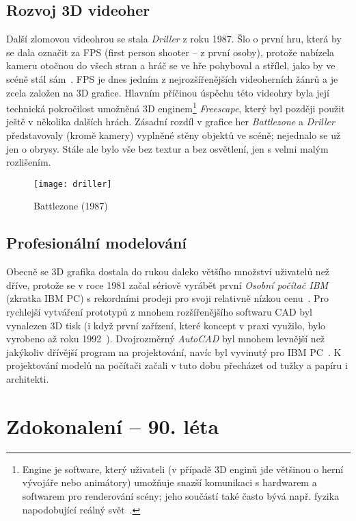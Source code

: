 \documentclass[a4paper, 11pt]{report}
\begin{document}
\begin{chapterwithoutpagebreak}
\section{Rozvoj 3D videoher}
Další zlomovou videohrou se stala  \emph{Driller} z roku 1987. Šlo o první hru, která by se dala označit za FPS (first person shooter --  z první osoby), protože nabízela kameru otočnou do všech stran a hráč se ve hře pohyboval a střílel, jako by ve scéně stál sám~\cite{wiki:driller}. FPS je dnes jedním z nejrozšířenějších videoherních žánrů a je zcela založen na 3D grafice. Hlavním příčinou úspěchu této videohry byla její technická pokročilost umožněná 3D enginem\footnote{Engine je software, který uživateli (v případě 3D enginů jde většinou o herní vývojáře nebo animátory) umožňuje snazší komunikaci s hardwarem a softwarem pro renderování scény; jeho součástí také často bývá např. fyzika napodobující reálný svět~\cite{techjunkie:engine}.} \emph{Freescape}, který byl později použit ještě v několika dalších hrách. Zásadní rozdíl v grafice her \emph{Battlezone} a \emph{Driller} představovaly (kromě kamery) vyplněné stěny objektů ve scéně; nejednalo se už jen o obrysy. Stále ale bylo vše bez textur a bez osvětlení, jen s velmi malým rozlišením.

\begin{figure}[H]
    \centering
    \texttt{[image: driller]}
    \caption[Driller (1987)]{Battlezone (1987)~\cite{pic:driller}}
\end{figure}

\section{Profesionální modelování}
Obecně se 3D grafika dostala do rukou daleko většího množství uživatelů než dříve, protože se v roce 1981 začal sériově vyrábět první \emph{Osobní počítač IBM} (zkratka IBM PC) s rekordními prodeji pro svoji relativně nízkou cenu~\cite{ibm:pc}. Pro rychlejší vytváření prototypů z mnohem rozšířenějšího softwaru CAD byl vynalezen 3D tisk (i když první zařízení, které koncept v praxi využilo, bylo vyrobeno až roku 1992~\cite{bcn3d:invention}). Dvojrozměrný \emph{AutoCAD} byl mnohem levnější než jakýkoliv dřívější program na projektování, navíc byl vyvinutý pro IBM PC~\cite{cadstudio:history}. K projektování modelů na počítači začali v tuto dobu přecházet od tužky a papíru i architekti.

\chapter{Zdokonalení -- 90. léta}

\end{chapterwithoutpagebreak}
\end{document}
